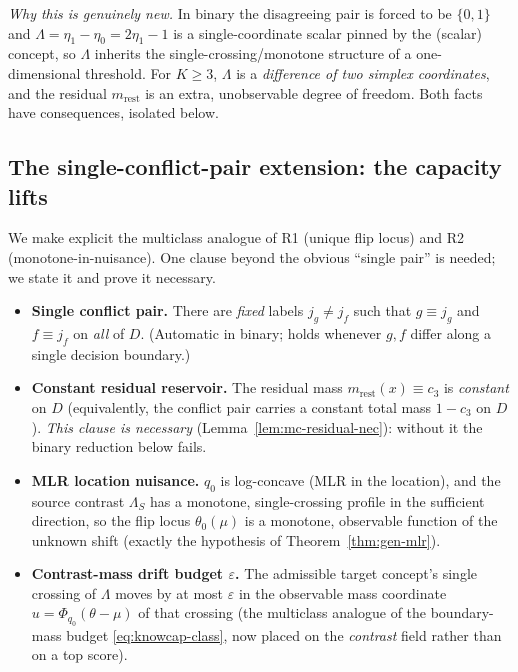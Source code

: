 \noindent\emph{Why this is genuinely new.} In binary the disagreeing pair is forced to be
$\{0,1\}$ and $\Lambda=\eta_1-\eta_0=2\eta_1-1$ is a single-coordinate scalar pinned by
the (scalar) concept, so $\Lambda$ inherits the single-crossing/monotone structure of a
one-dimensional threshold. For $K\ge3$, $\Lambda$ is a \emph{difference of two simplex
coordinates}, and the residual $m_{\mathrm{rest}}$ is an extra, unobservable degree of
freedom. Both facts have consequences, isolated below.

\subsection{The single-conflict-pair extension: the capacity lifts}\label{sec:mc-lift}
We make explicit the multiclass analogue of R1 (unique flip locus) and R2
(monotone-in-nuisance). One clause beyond the obvious ``single pair'' is needed; we state it
and prove it necessary.
\begin{itemize}\itemsep2pt
\item[\textnormal{(M1)}] \textbf{Single conflict pair.} There are \emph{fixed} labels
$j_g\neq j_f$ such that $g\equiv j_g$ and $f\equiv j_f$ on \emph{all} of $D$. (Automatic in
binary; holds whenever $g,f$ differ along a single decision boundary.)
\item[\textnormal{(M1$'$)}] \textbf{Constant residual reservoir.} The residual mass
$m_{\mathrm{rest}}(x)\equiv c_3$ is \emph{constant} on $D$ (equivalently, the conflict pair
carries a constant total mass $1-c_3$ on $D$). \emph{This clause is necessary}
(Lemma~\ref{lem:mc-residual-nec}): without it the binary reduction below fails.
\item[\textnormal{(M2)}] \textbf{MLR location nuisance.} $q_0$ is log-concave (MLR in the
location), and the source contrast $\Lambda_S$ has a monotone, single-crossing profile in
the sufficient direction, so the flip locus $\theta_0(\mu)$ is a monotone, observable
function of the unknown shift (exactly the hypothesis of Theorem~\ref{thm:gen-mlr}).
\item[\textnormal{(M3)}] \textbf{Contrast-mass drift budget $\varepsilon$.} The admissible
target concept's single crossing of $\Lambda$ moves by at most $\varepsilon$ in the
observable mass coordinate $u=\Phi_{q_0}(\theta-\mu)$ of that crossing (the multiclass
analogue of the boundary-mass budget \eqref{eq:knowcap-class}, now placed on the
\emph{contrast} field rather than on a top score).
\end{itemize}

